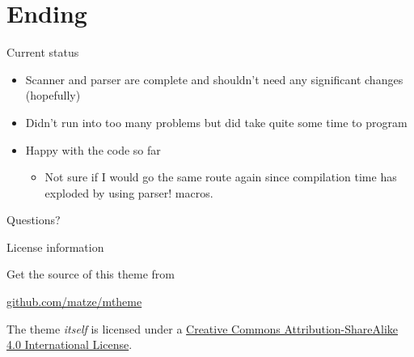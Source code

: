 \documentclass[10pt]{beamer}
\begin{document}
\section{Ending}
\begin{frame}{Current status}
    \begin{itemize}
        \item Scanner and parser are complete and shouldn't need any significant changes (hopefully)
    \item Didn't run into too many problems but did take quite some time to program
    \item Happy with the code so far
        \begin{itemize}
            \item Not sure if I would go the same route again since compilation time has exploded by using parser! macros.
        \end{itemize}
    \end{itemize}
\end{frame}

{
\begin{frame}[standout]
  Questions?
\end{frame}
}

\begin{frame}{License information}

  Get the source of this theme from

  \begin{center}\url{github.com/matze/mtheme}\end{center}

  The theme \emph{itself} is licensed under a
  \href{http://creativecommons.org/licenses/by-sa/4.0/}{Creative Commons
  Attribution-ShareAlike 4.0 International License}.

  \begin{center}\ccbysa\end{center}

\end{frame}
\end{document}

